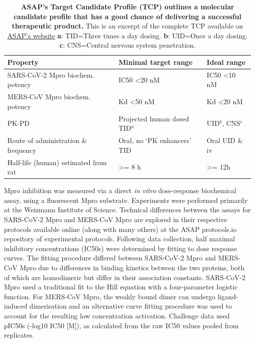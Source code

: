 \documentclass[journal=jcim,manuscript=article]{achemso}
\begin{document}
\begin{table}[]
\begin{tabular}{lll}
Property & Minimal target range & Ideal range \\ \hline
SARS-CoV-2 Mpro biochem. potency & IC50 \textless 20 nM & IC50 \textless 10 nM \\
MERS-CoV Mpro biochem. potency & Kd \textless 50 nM & Kd \textless 20 nM \\
PK-PD & Projected human dosed TID$^{a}$ & UID$^{b}$, CNS$^{c}$ \\
Route of administration \& frequency & Oral, no ‘PK enhancers’ TID & Oral UID \& iv \\
Half-life (human) estimated from rat & \textgreater{}= 8 h & \textgreater{}= 12h
\end{tabular}
\caption{\textbf{ASAP's Target Candidate Profile (TCP) outlines a molecular candidate profile that has a good chance of delivering a successful therapeutic product.} This is an excerpt of the complete TCP available on \hyperlink{https://docs.google.com/presentation/d/1uZht18ZJnHuwMtwxY4prDBSl4SFMK-ics4ERhDgiJ2s/edit?slide=id.g285bac68500_0_227#slide=id.g285bac68500_0_227}{ASAP's website} \textbf{a}: TID=Three times a day dosing. \textbf{b}: UID=Once a day dosing. \textbf{c}: CNS=Central nervous system penetration.}
\label{table_tcp}
\end{table}
Mpro inhibition was measured via a direct \textit{in vitro} dose-response biochemical assay, using a fluorescent Mpro substrate. Experiments were performed primarily at the Weizmann Institute of Science. Technical differences between the assays for SARS-CoV-2 Mpro\cite{sars_mpro_dose_response_protocol} and MERS-CoV Mpro\cite{mers_mpro_dose_response_protocol} are explored in their respective protocols available online (along with many others) at the ASAP protocols.io repository of experimental protocols\cite{asap_protocols_io}. Following data collection, half maximal inhibitory concentrations (IC50s) were determined by fitting to dose response curves. The fitting procedure differed between SARS-CoV-2 Mpro and MERS-CoV Mpro due to differences in binding kinetics between the two proteins, both of which are homodimeric but differ in their association constants. SARS-CoV-2 Mpro used a traditional fit to the Hill equation\cite{Hill_eq_1910} with a four-parameter logistic function. For MERS-CoV Mpro, the weakly bound dimer can undergo ligand-induced dimerisation and an alternative curve fitting procedure was used to account for the resulting low concentration activation.\cite{la_kang_minh_2025} Challenge data used pIC50s (-log10 IC50 [M]), as calculated from the raw IC50 values pooled from replicates. 
\end{document}
